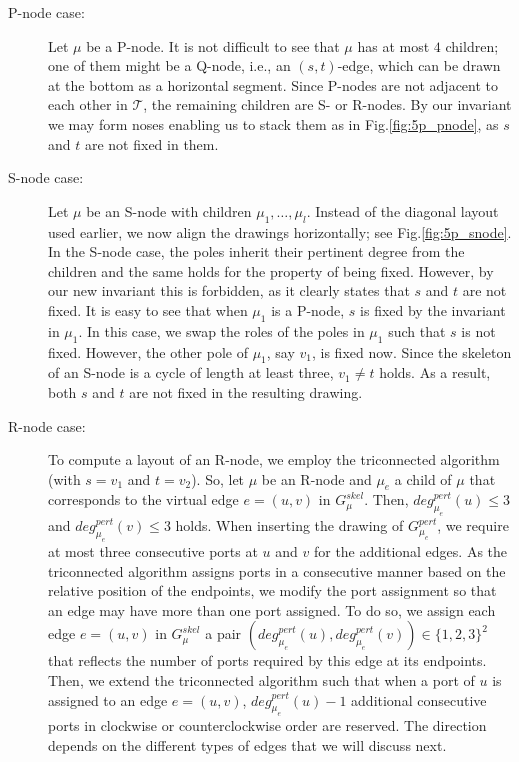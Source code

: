 \documentclass[a4paper,twoside,11pt]{article}
\newcommand{\skel}[1]{G^\textit{skel}_{#1}}
\newcommand{\pert}[1]{G^\textit{pert}_{#1}}
\newcommand{\pdeg}[2]{\textit{deg}^{\textit{pert}}_{#1}(#2)}
\begin{document}
\begin{description}
\item[P-node case:] Let $\mu$ be a P-node. It is not difficult to see
that $\mu$ has at most $4$ children; one of them might be a Q-node,
i.e., an $(s,t)$-edge, which can be drawn at the bottom as a
horizontal segment. Since P-nodes are not adjacent to each other in
$\mathcal{T}$, the remaining children are S- or R-nodes. By our
invariant we may form noses enabling us to stack them as in
Fig.\ref{fig:5p_pnode}, as $s$ and $t$ are not fixed in them.
\item[S-node case:] Let $\mu$ be an S-node with children $\mu_1,
\ldots, \mu_l$. Instead of the diagonal layout used earlier, we now
align the drawings horizontally; see Fig.\ref{fig:5p_snode}. In the
S-node case, the poles inherit their pertinent degree from the
children and the same holds for the property of being fixed.
However, by our new invariant this is forbidden, as it clearly
states that $s$ and $t$ are not fixed. It is easy to see that when
$\mu_1$ is a P-node, $s$ is fixed by the invariant in $\mu_1$. In
this case, we swap the roles of the poles in $\mu_1$ such that $s$
is not fixed. However, the other pole of $\mu_1$, say $v_1$, is
fixed now. Since the skeleton of an S-node is a cycle of length at
least three, $v_1 \neq t$ holds. As a result, both $s$ and $t$ are
not fixed in the resulting drawing.
\item[R-node case:] To compute a layout of an R-node, we employ the
triconnected algorithm (with $s = v_1$ and $t =v_2$). So, let $\mu$
be an R-node and $\mu_{e}$ a child of $\mu$ that corresponds to
the virtual edge $e = (u,v)$ in $\skel{\mu}$. Then, $\pdeg{\mu_{e}}{u}
\leq 3$ and $\pdeg{\mu_{e}}{v} \leq 3$ holds. When inserting the
drawing of $\pert{\mu_e}$, we require at most three consecutive
ports at $u$ and $v$ for the additional edges. As the triconnected
algorithm assigns ports in a consecutive manner based on the
relative position of the endpoints, we modify the port assignment so
that an edge may have more than one port assigned. To do so, we
assign each edge $e = (u,v)$ in $\skel{\mu}$ a pair
$(\pdeg{\mu_e}{u}, \pdeg{\mu_e}{v}) \in \{ 1, 2, 3 \}^2$ that
reflects the number of ports required by this edge at its endpoints.
Then, we extend the triconnected algorithm such that when a port of
$u$ is assigned to an edge $e = (u,v)$, $\pdeg{\mu_e}{u}-1$
additional consecutive ports in clockwise or counterclockwise order
are reserved. The direction depends on the different types of edges
that we will discuss next.


\end{description}
\end{document}
